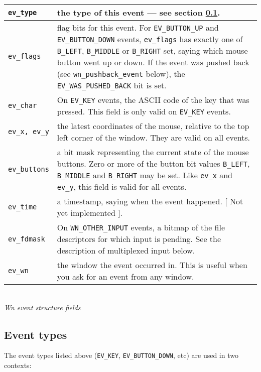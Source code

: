 \begin{center}
\begin{tabular}{|l|p{4.75in}|} \hline
{\tt ev\_type} & the type of this event --- see section \ref{evtype}. \\ \hline

{\tt ev\_flags} & flag bits for this event.
For {\tt EV\_BUTTON\_UP} and {\tt EV\_BUTTON\_DOWN} events, {\tt ev\_flags}
has exactly one of {\tt B\_LEFT}, {\tt B\_MIDDLE} or
{\tt B\_RIGHT} set, saying which mouse button went up or down.
If the event was pushed back (see {\tt wn\_pushback\_event} below), the
{\tt EV\_WAS\_PUSHED\_BACK} bit is set. \\ \hline

{\tt ev\_char} &
On {\tt EV\_KEY} events, the ASCII code of the key that was pressed.
This field is only valid on {\tt EV\_KEY} events. \\ \hline

{\tt ev\_x, ev\_y} &
the latest coordinates of the mouse,
relative to the top left corner of the window.
They are valid on all events. \\ \hline

{\tt ev\_buttons} &
a bit mask representing the current state of the mouse buttons.
Zero or more of the button bit values {\tt B\_LEFT}, {\tt B\_MIDDLE} and
{\tt B\_RIGHT} may be set.
Like {\tt ev\_x} and {\tt ev\_y}, this field is valid for all events. \\ \hline

{\tt ev\_time} &
a timestamp, saying when the event happened.
[ Not yet implemented ]. \\ \hline

{\tt ev\_fdmask} &
On {\tt WN\_OTHER\_INPUT} events,
a bitmap of the file descriptors for which input is pending.
See the description of multiplexed input below. \\ \hline

{\tt ev\_wn} &
the window the event occurred in.
This is useful when you ask for an event from any window. \\ \hline
\end{tabular}\\[0.1in]
{\em Wn event structure fields}
\end{center}
\subsection{Event types}
\label{evtype}
The event types listed above ({\tt EV\_KEY}, {\tt EV\_BUTTON\_DOWN}, etc) are
used in two contexts:

